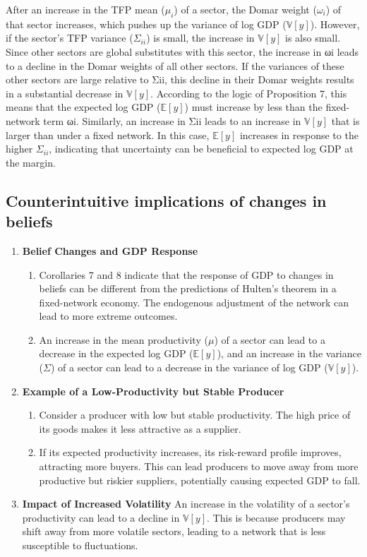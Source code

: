\documentclass[11pt]{article}
\theoremstyle{definition}
\begin{document}
	After an increase in the TFP mean ($\mu_i$) of a sector, the Domar weight ($\omega_i$) of that sector increases, which pushes up the variance of log GDP ($\mathbb{V}[y]$). However, if the sector's TFP variance ($\Sigma_{ii}$) is small, the increase in $\mathbb{V}[y]$ is also small. Since other sectors are global substitutes with this sector, the increase in ωi leads to a decline in the Domar weights of all other sectors. If the variances of these other sectors are large relative to Σii, this decline in their Domar weights results in a substantial decrease in $\mathbb{V}[y]$. According to the logic of Proposition 7, this means that the expected log GDP ($\mathbb{E}[y]$) must increase by less than the fixed-network term ωi. Similarly, an increase in Σii leads to an increase in $\mathbb{V}[y]$ that is larger than under a fixed network. In this case, $\mathbb{E}[y]$ increases in response to the higher $\Sigma_{ii}$, indicating that uncertainty can be beneficial to expected log GDP at the margin.
	
	\subsection*{Counterintuitive implications of changes in beliefs}
	\begin{enumerate}[leftmargin=1cm, label=\arabic*.]
		\item \textbf{Belief Changes and GDP Response}
		\begin{enumerate}[leftmargin=1cm]
			\item Corollaries 7 and 8 indicate that the response of GDP to changes in beliefs can be different from the predictions of Hulten’s theorem in a fixed-network economy. The endogenous adjustment of the network can lead to more extreme outcomes.
			\item An increase in the mean productivity ($\mu$) of a sector can lead to a decrease in the expected log GDP ($\mathbb{E}[y]$), and an increase in the variance ($\Sigma$) of a sector can lead to a decrease in the variance of log GDP ($\mathbb{V}[y]$).
		\end{enumerate} 
		\item \textbf{Example of a Low-Productivity but Stable Producer}
		\begin{enumerate}[leftmargin=1cm]
			\item Consider a producer with low but stable productivity. The high price of its goods makes it less attractive as a supplier.
			\item If its expected productivity increases, its risk-reward profile improves, attracting more buyers. This can lead producers to move away from more productive but riskier suppliers, potentially causing expected GDP to fall.
		\end{enumerate} 
		\item \textbf{Impact of Increased Volatility} An increase in the volatility of a sector’s productivity can lead to a decline in $\mathbb{V}[y]$. This is because producers may shift away from more volatile sectors, leading to a network that is less susceptible to fluctuations.
	\end{enumerate}
\end{document}
